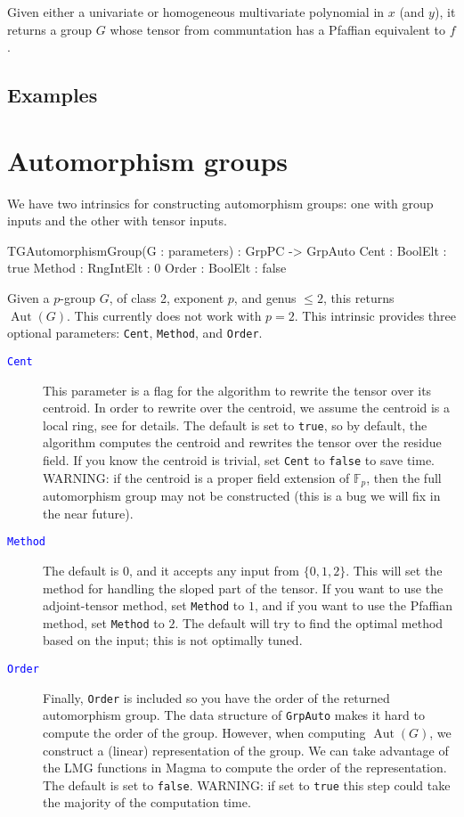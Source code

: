 \documentclass{documentation}
\DeclareMathOperator{\Aut}{Aut}
\begin{document}
Given either a univariate or homogeneous multivariate polynomial in $x$ (and $y$), it returns a group $G$ whose tensor from communtation has a Pfaffian equivalent to $f$.

\section{Examples}

\chapter{Automorphism groups}

We have two intrinsics for constructing automorphism groups: one with group inputs and the other with tensor inputs. 

\begin{intrinsics}
TGAutomorphismGroup(G : parameters) : GrpPC -> GrpAuto
    Cent : BoolElt : true
    Method : RngIntElt : 0 
    Order : BoolElt : false
\end{intrinsics}

Given a $p$-group $G$, of class 2, exponent $p$, and genus $\leq 2$, this returns $\Aut(G)$.
This currently does not work with $p=2$.
This intrinsic provides three optional parameters: {\tt Cent}, {\tt Method}, and {\tt Order}.

\begin{description}
\item[\textcolor{blue}{\tt Cent}]
This parameter is a flag for the algorithm to rewrite the tensor over its centroid. 
In order to rewrite over the centroid, we assume the centroid is a local ring, see \cite{eMAGma} for details.
The default is set to {\tt true}, so by default, the algorithm computes the centroid and rewrites the tensor over the residue field.
If you know the centroid is trivial, set {\tt Cent} to {\tt false} to save time.
WARNING: if the centroid is a proper field extension of $\mathbb{F}_p$, then the full automorphism group may not be constructed (this is a bug we will fix in the near future).
\item[\textcolor{blue}{\tt Method}]
The default is $0$, and it accepts any input from $\{ 0,1,2\}$. 
This will set the method for handling the sloped part of the tensor.
If you want to use the adjoint-tensor method, set {\tt Method} to $1$, and if you want to use the Pfaffian method, set {\tt Method} to $2$. The default will try to find the optimal method based on the input; this is not optimally tuned.
\item[\textcolor{blue}{\tt Order}]
Finally, {\tt Order} is included so you have the order of the returned automorphism group. 
The data structure of {\tt GrpAuto} makes it hard to compute the order of the group. 
However, when computing $\Aut(G)$, we construct a (linear) representation of the group. 
We can take advantage of the LMG functions \cite{LMG} in Magma to compute the order of the representation. 
The default is set to {\tt false}. 
WARNING: if set to {\tt true} this step could take the majority of the computation time.
\end{description}
\end{document}
